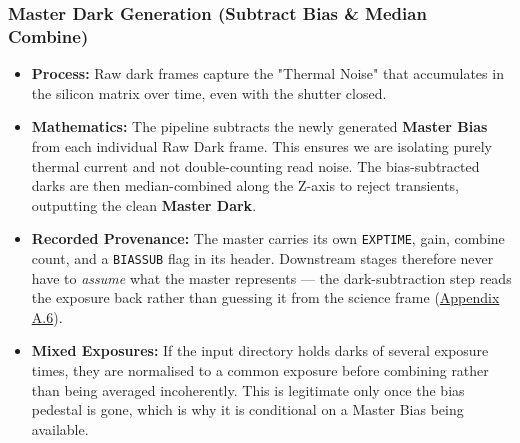 \documentclass[11pt,a4paper]{article}
\begin{document}
\subsubsection{Master Dark Generation (Subtract Bias \& Median Combine)}
\begin{itemize}[leftmargin=*]
    \item \textbf{Process:} Raw dark frames capture the "Thermal Noise" that accumulates in the silicon matrix over time, even with the shutter closed.
    \item \textbf{Mathematics:} The pipeline subtracts the newly generated \textbf{Master Bias} from each individual Raw Dark frame. This ensures we are isolating purely thermal current and not double-counting read noise. The bias-subtracted darks are then median-combined along the Z-axis to reject transients, outputting the clean \textbf{Master Dark}.
    \item \textbf{Recorded Provenance:} The master carries its own \texttt{EXPTIME}, gain, combine count, and a \texttt{BIASSUB} flag in its header. Downstream stages therefore never have to \emph{assume} what the master represents --- the dark-subtraction step reads the exposure back rather than guessing it from the science frame (\hyperref[app:dark]{Appendix A.6}).
    \item \textbf{Mixed Exposures:} If the input directory holds darks of several exposure times, they are normalised to a common exposure before combining rather than being averaged incoherently. This is legitimate only once the bias pedestal is gone, which is why it is conditional on a Master Bias being available.
\end{itemize}
\end{document}
